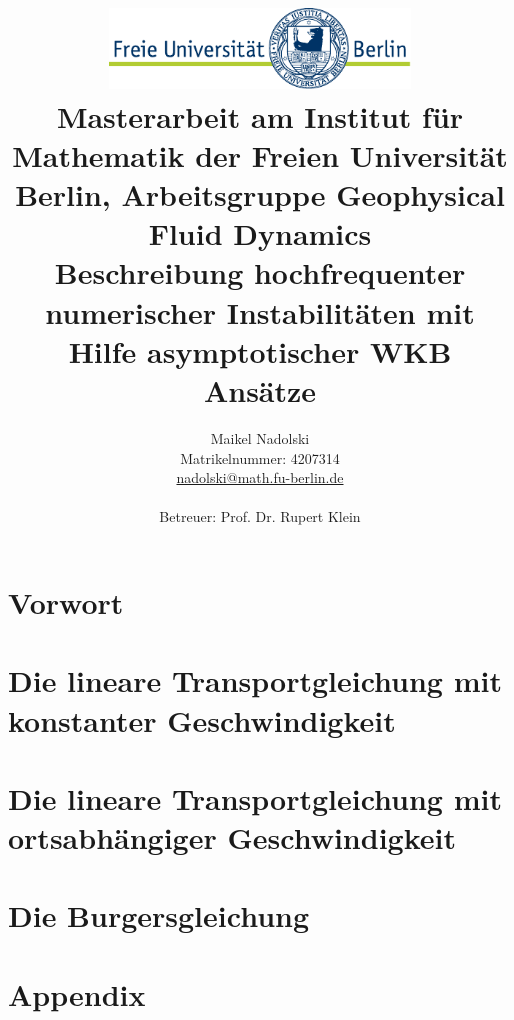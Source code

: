 \documentclass[a4paper
               ,11pt%
               ,openright%
               ,titlepage%
               ]{scrreprt}
\title{\includegraphics[width=0.6\textwidth]{pictures/logo}\\
{\normalsize Masterarbeit am Institut für Mathematik der Freien Universität Berlin, Arbeitsgruppe Geophysical Fluid Dynamics}\\[6ex]
Beschreibung hochfrequenter numerischer Instabilitäten mit Hilfe asymptotischer WKB Ansätze}
\author{Maikel Nadolski\\
{\normalsize Matrikelnummer: 4207314}\\
{\normalsize \href{mailto:nadolski@math.fu-berlin.de}{nadolski@math.fu-berlin.de}}
\vspace{3cm}\\\\
{\normalsize Betreuer: Prof. Dr. Rupert Klein}}
\numberwithin{equation}{section}
\begin{document}
\maketitle

\tableofcontents

\chapter{Vorwort}

% 
\chapter{Die lineare Transportgleichung mit konstanter Geschwindigkeit}

\chapter{Die lineare Transportgleichung mit ortsabhängiger Geschwindigkeit}

\chapter{Die Burgersgleichung}




\appendix

\chapter{Appendix}

\end{document}

